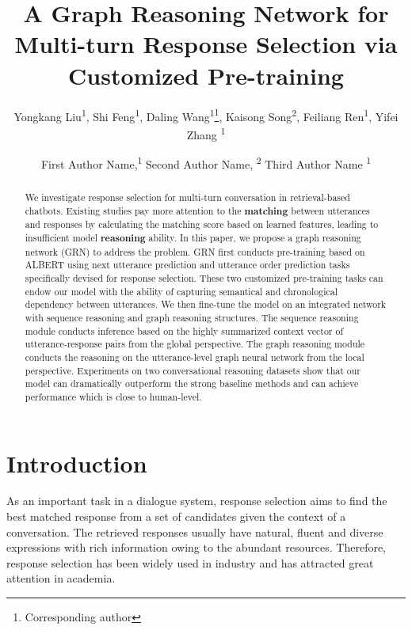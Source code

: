\documentclass[letterpaper]{article}
\title{A Graph Reasoning Network for Multi-turn Response Selection via Customized Pre-training}
\author {
        Yongkang Liu\textsuperscript{\rm 1},
        Shi Feng\textsuperscript{\rm 1},
        Daling Wang\textsuperscript{\rm 1}\thanks{Corresponding author},
        Kaisong Song\textsuperscript{\rm 2},
        Feiliang Ren\textsuperscript{\rm 1},
        Yifei Zhang \textsuperscript{\rm 1}\\
}
\author {

        First Author Name,\textsuperscript{\rm 1}
        Second Author Name, \textsuperscript{\rm 2}
        Third Author Name \textsuperscript{\rm 1} \\
}
\begin{document}
\maketitle

\begin{abstract}
We investigate response selection for multi-turn conversation in retrieval-based chatbots. Existing studies pay more attention to the \textbf{matching} between utterances and responses by calculating the matching score based on learned features, leading to insufficient model \textbf{reasoning} ability. In this paper, we propose a graph reasoning network (GRN) to address the problem. GRN first conducts pre-training based on ALBERT using next utterance prediction and utterance order prediction tasks specifically devised for response selection. These two customized pre-training tasks can endow our model with the ability of capturing semantical and chronological dependency between utterances. We then fine-tune the model on an integrated network with sequence reasoning and graph reasoning structures. The sequence reasoning module conducts inference based on the highly summarized context vector of utterance-response pairs from the global perspective. The graph reasoning module conducts the reasoning on the utterance-level graph neural network from the local perspective. Experiments on two conversational reasoning datasets show that our model can dramatically outperform the strong baseline methods and can achieve performance which is close to human-level.
\end{abstract}

\section{Introduction}
As an important task in a dialogue system, response selection aims to find the best matched response from a set of candidates given the context of a conversation. The retrieved responses usually have natural, fluent and diverse expressions with rich information owing to the abundant resources. Therefore, response selection has been widely used in industry and has attracted great attention in academia.
\end{document}
